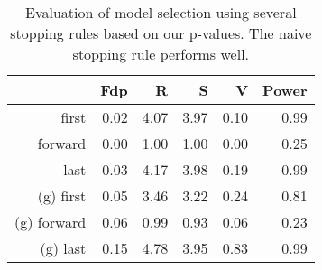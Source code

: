\begin{table}[ht]
\centering
\begin{tabular}{rrrrrr}
  \hline
 & Fdp & R & S & V & Power \\ 
  \hline
first & 0.02 & 4.07 & 3.97 & 0.10 & 0.99 \\ 
  forward & 0.00 & 1.00 & 1.00 & 0.00 & 0.25 \\ 
  last & 0.03 & 4.17 & 3.98 & 0.19 & 0.99 \\ 
  (g) first & 0.05 & 3.46 & 3.22 & 0.24 & 0.81 \\ 
  (g) forward & 0.06 & 0.99 & 0.93 & 0.06 & 0.23 \\ 
  (g) last & 0.15 & 4.78 & 3.95 & 0.83 & 0.99 \\ 
   \hline
\end{tabular}
\caption{Evaluation of model selection using several stopping rules based on our p-values. The naive stopping rule performs well.} 
\end{table}

